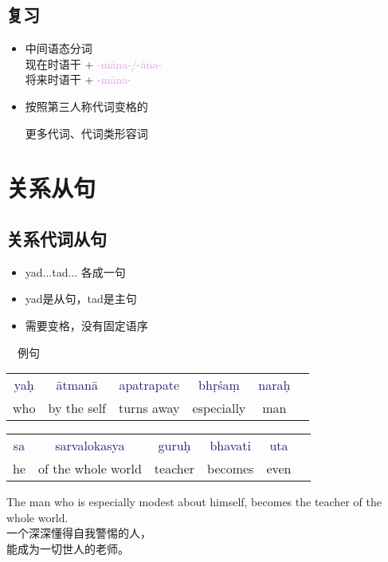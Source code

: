 \documentclass[17pt]{beamer}
\newcommand{\pratyaya}[1]{\textcolor{Plum}{#1}}
\newcommand{\fullsentence}[1]{\textcolor{MidnightBlue}{#1}}
\begin{document}
\subsection{复习}
\begin{frame}{\insertsubsection}
  \begin{itemize}
    \item 中间语态分词\\  
    现在时语干 + \pratyaya{\nobreakdash-māna\nobreakdash-/\nobreakdash-āna\nobreakdash-} \\
    将来时语干 + \pratyaya{\nobreakdash-māna\nobreakdash-} 
    \item 按照第三人称代词变格的
    
    更多代词、代词类形容词
  \end{itemize}
\end{frame}

\section{关系从句}
\begin{frame}{\insertsection }
    \small
    \tableofcontents[currentsection]
\end{frame}

\subsection{关系代词从句}
\begin{frame}{\insertsubsection }
  \begin{itemize}
    \item yad...tad... 各成一句
    \item yad是从句，tad是主句
    \item 需要变格，没有固定语序
  \end{itemize}
\end{frame}

\begin{frame}{\insertsubsection ~~例句}
  \small
  \begin{tabular}{@{}cccccc@{}} %
    \fullsentence{yaḥ}  & \fullsentence{ātmanā} & \fullsentence{apatrapate} & \fullsentence{bhṛśaṃ} & \fullsentence{naraḥ}   \\
    who &  by the self & turns away & especially & man \\
  \end{tabular}
  \begin{tabular}{@{}cccccc@{}} %
    \fullsentence{sa}  & \fullsentence{sarvalokasya} & \fullsentence{guruḥ} & \fullsentence{bhavati} & \fullsentence{uta}   \\
    he &  of the whole world & teacher & becomes & even \\
  \end{tabular}

  \bigskip
  The man who is especially modest about himself, becomes the teacher of the whole world.\\
  一个深深懂得自我警惕的人，\\能成为一切世人的老师。
\end{frame}
\end{document}
